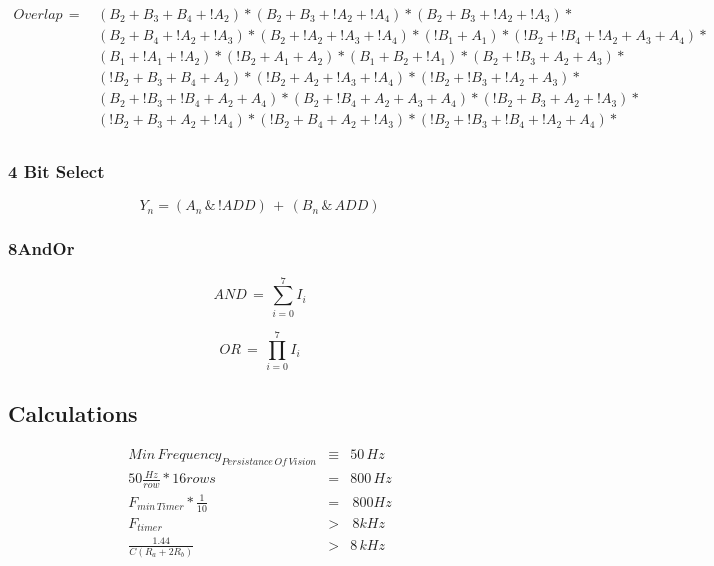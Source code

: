 \documentclass[letterpaper,titlepage,oneside]{article}
\begin{document}
\begin{align*} 
Overlap\,=\, 	&(B_{2}+B_{3}+B_{4}+!A_{2})*(B_{2}+B_{3}+!A_{2}+!A_{4})*(B_{2}+B_{3}+!A_{2}+!A_{3})*\\
			&(B_{2}+B_{4}+!A_{2}+!A_{3})*(B_{2}+!A_{2}+!A_{3}+!A_{4})*(!B_{1}+A_{1})*(!B_{2}+!B_{4}+!A_{2}+A_{3}+A_{4})*\\
			&(B_{1}+!A_{1}+!A_{2})*(!B_{2}+A_{1}+A_{2})*(B_{1}+B_{2}+!A_{1})*(B_{2}+!B_{3}+A_{2}+A_{3})*\\
&(!B_{2}+B_{3}+B_{4}+A_{2})*(!B_{2}+A_{2}+!A_{3}+!A_{4})*(!B_{2}+!B_{3}+!A_{2}+A_{3})*\\
&(B_{2}+!B_{3}+!B_{4}+A_{2}+A_{4})*(B_{2}+!B_{4}+A_{2}+A_{3}+A_{4})*(!B_{2}+B_{3}+A_{2}+!A_{3})*\\
&(!B_{2}+B_{3}+A_{2}+!A_{4})*(!B_{2}+B_{4}+A_{2}+!A_{3})*(!B_{2}+!B_{3}+!B_{4}+!A_{2}+A_{4})*\\
\end{align*}


\subsubsection{4 Bit Select}
\begin{equation}\nonumber
Y_{n} = (A_{n} \,\&\, !ADD) \,+\, (B_{n} \,\&\, ADD)
\end{equation}

\subsubsection{8AndOr}
\begin{equation}\nonumber
AND \,=\, \sum_{i=0}^{7} I_{i}
\end{equation}

\begin{equation}\nonumber
OR \, = \, \prod_{i=0}^{7} I_{i}
\end{equation}

\subsection{Calculations}
\begin{align*}
Min\,Frequency_{Persistance\, Of\, Vision} &\equiv& 50\,Hz\\
50 \frac{Hz}{row} * 16 rows&=& 800\,Hz \\
F_{min\,Timer} * \frac{1}{10} &=& \,800Hz \\
F_{timer} &>& \,8kHz \\
\frac{1.44}{C(R_{a} + 2 R_{b})} &>& 8\,kHz \\
\end{align*}
\end{document}
